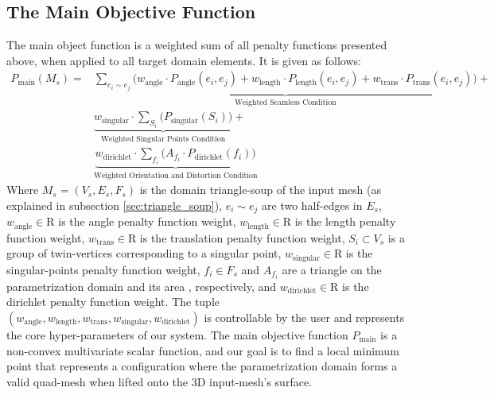 \subsection{The Main Objective Function}
The main object function is a weighted sum of all penalty functions presented above, when applied to all target domain elements. It is given as follows:
\begin{equation}\label{eq:main_objective_function}
\begin{split}
P_{\mathrm{main}}\left(M_s\right) = &\underbrace{\sum_{e_i \sim e_j} \Big(w_{\mathrm{angle}} \cdot P_{\mathrm{angle}}\left(e_i,e_j\right) + w_{\mathrm{length}} \cdot P_{\mathrm{length}}\left(e_i,e_j\right) + w_{\mathrm{trans}} \cdot P_{\mathrm{trans}}\left(e_i,e_j\right)\Big)}_{\text{Weighted Seamless Condition}} + \\
&\underbrace{w_{\mathrm{singular}} \cdot \sum_{S_i} \Big(P_{\mathrm{singular}}\left(S_i\right)\Big)}_{\text{Weighted Singular Points Condition}} +
\\
&\underbrace{w_{\mathrm{dirichlet}} \cdot \sum_{f_i} \Big(A_{f_i} \cdot P_{\mathrm{dirichlet}}\left(f_i\right)\Big)}_{\text{Weighted Orientation and Distortion Condition}}
\end{split}
\end{equation}
Where $M_s = \left(V_s, E_s, F_s\right)$ is the domain triangle-soup of the input mesh (as explained in subsection \ref{sec:triangle_soup}), $e_i \sim e_j$ are two half-edges in $E_s$, $w_{\mathrm{angle}} \in \mathrm{R}$ is the angle penalty function weight, $w_{\mathrm{length}} \in \mathrm{R}$ is the length penalty function weight, $w_{\mathrm{trans}} \in \mathrm{R}$ is the translation penalty function weight, $S_i \subset V_s$ is a group of twin-vertices corresponding to a singular point, $w_{\mathrm{singular}} \in \mathrm{R}$ is the singular-points penalty function weight, $f_i \in F_s$ and $A_{f_i}$ are a triangle on the parametrization domain and its area , respectively, and $w_{\mathrm{dirichlet}} \in \mathrm{R}$ is the dirichlet penalty function weight. The tuple $\left(w_{\mathrm{angle}}, w_{\mathrm{length}}, w_{\mathrm{trans}}, w_{\mathrm{singular}}, w_{\mathrm{dirichlet}}\right)$ is controllable by the user and represents the core hyper-parameters of our system. The main objective function $P_{\mathrm{main}}$ is a non-convex multivariate scalar function, and our goal is to find a local minimum point that represents a configuration where the parametrization domain forms a valid quad-mesh when lifted onto the 3D input-mesh's surface.
